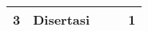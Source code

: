 \begin{spacing}{1.5}
\begin{table}[H]
\begin{tabular}{|l|l|lll|}
			3                   & Disertasi                                                                                                           & \multicolumn{1}{l|}{}    & \multicolumn{1}{l|}{}                                                             & 1                                                              \\ \hline
		\end{tabular}
	\end{table}
%
	
\end{spacing}